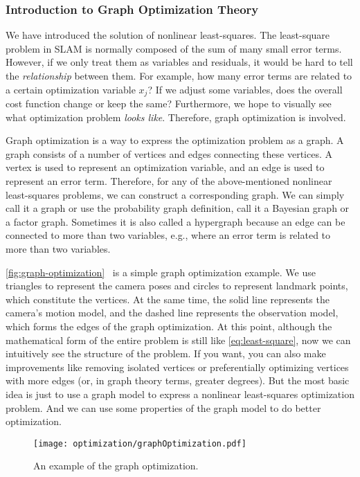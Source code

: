 \subsubsection{Introduction to Graph Optimization Theory}
We have introduced the solution of nonlinear least-squares. The least-square problem in SLAM is normally composed of the sum of many small error terms. However, if we only treat them as variables and residuals, it would be hard to tell the \textit{relationship} between them. For example, how many error terms are related to a certain optimization variable $x_j$? If we adjust some variables, does the overall cost function change or keep the same? Furthermore, we hope to visually see what optimization problem \textit{looks like}. Therefore, graph optimization is involved.

Graph optimization is a way to express the optimization problem as a graph.  A graph consists of a number of vertices and edges connecting these vertices. A  vertex is used to represent an optimization variable, and an edge is used to represent an error term. Therefore, for any of the above-mentioned nonlinear least-squares problems, we can construct a corresponding graph. We can simply call it a graph or use the probability graph definition, call it a Bayesian graph or a factor graph. Sometimes it is also called a hypergraph because an edge can be connected to more than two variables, e.g., where an error term is related to more than two variables. 

\autoref{fig:graph-optimization}~ is a simple graph optimization example. We use triangles to represent the camera poses and circles to represent landmark points, which constitute the vertices. At the same time, the solid line represents the camera's motion model, and the dashed line represents the observation model, which forms the edges of the graph optimization. At this point, although the mathematical form of the entire problem is still like \eqref{eq:least-square}, now we can intuitively see the structure of the problem. If you want, you can also make improvements like removing isolated vertices or preferentially optimizing vertices with more edges (or, in graph theory terms, greater degrees). But the most basic idea is just to use a graph model to express a nonlinear least-squares optimization problem. And we can use some properties of the graph model to do better optimization.

\begin{figure}[!ht]
    \centering
    \texttt{[image: optimization/graphOptimization.pdf]}
    \caption{An example of the graph optimization.}
    \label{fig:graph-optimization}
\end{figure}

